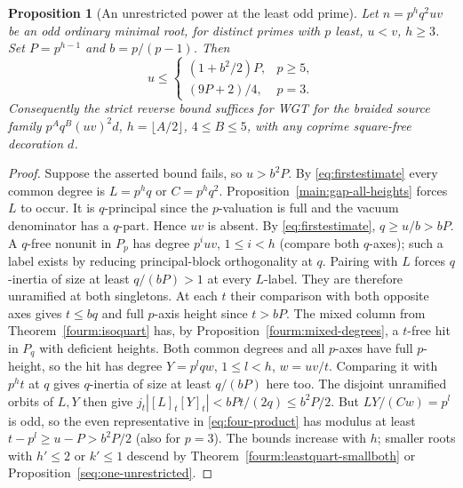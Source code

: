 \documentclass[11pt,a4paper]{article}
\numberwithin{equation}{section}
\newtheorem{proposition}[theorem]{Proposition}
\theoremstyle{remark}
\begin{document}
\begin{proposition}[An unrestricted power at the least odd prime]\label{fam:M:9.17}
\label{r6:least-unrestricted}
Let $n=p^h q^2uv$ be an odd ordinary minimal root, for distinct
primes with $p$ least, $u<v$, $h\ge3$. Set $P=p^{h-1}$ and $b=p/(p-1)$.
Then
\[
 u\le\begin{cases}
       (1+b^2/2)P,&p\ge5,\\
       (9P+2)/4,&p=3.
      \end{cases}
\]
Consequently the strict reverse bound suffices for WGT for the
braided source family $p^A q^B(uv)^2d$, $h=\lfloor A/2\rfloor$,
$4\le B\le5$, with any coprime square-free decoration $d$.
\end{proposition}
\begin{proof}
Suppose the asserted bound fails, so $u>b^2P$.
By \eqref{eq:firstestimate} every common degree is $L=p^h q$ or
$C=p^h q^2$. Proposition~\ref{main:gap-all-heights} forces $L$ to occur.
It is $q$-principal since the $p$-valuation is full and
the vacuum denominator has a $q$-part. Hence $uv$ is absent.
By \eqref{eq:firstestimate}, $q\ge u/b>bP$. A $q$-free
nonunit in $P_p$ has degree $p^iuv$, $1\le i<h$ (compare both
$q$-axes); such a label exists by reducing principal-block
orthogonality at $q$. Pairing with $L$ forces $q$-inertia of size
at least $q/(bP)>1$ at every $L$-label. They are therefore
unramified at both singletons. At each $t$ their comparison with
both opposite axes gives $t\le bq$ and full $p$-axis height since
$t>bP$. The mixed column from Theorem~\ref{fourm:isoquart} has, by
Proposition~\ref{fourm:mixed-degrees}, a $t$-free hit in $P_q$
with deficient heights. Both common degrees and all $p$-axes have
full $p$-height, so the hit has degree $Y=p^l q w$, $1\le l<h$,
$w=uv/t$. Comparing it with $p^h t$ at $q$ gives $q$-inertia
of size at least $q/(bP)$ here too. The disjoint unramified orbits
of $L,Y$ then give $j_t|[L]_t[Y]_t|<bPt/(2q)\le b^2P/2$.
But $LY/(Cw)=p^l$ is odd, so the even representative in
\eqref{eq:four-product} has modulus at least $t-p^l\ge u-P>b^2P/2$
(also for $p=3$). The bounds increase with $h$; smaller roots
with $h'\le2$ or $k'\le1$ descend by Theorem~\ref{fourm:leastquart-smallboth}
or Proposition~\ref{seq:one-unrestricted}.
\end{proof}
\end{document}
